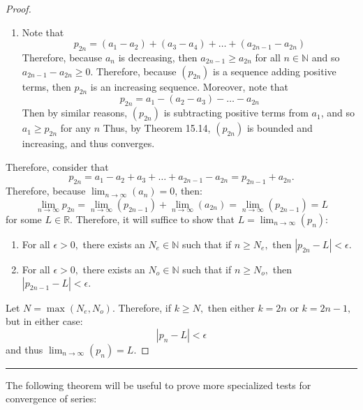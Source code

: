 \documentclass[openany, amssymb, psamsfonts]{amsart}
\newcommand{\bbN}{\mathbb{N}}
\newcommand{\bbR}{\mathbb{R}}
\theoremstyle{definition}
\numberwithin{equation}{section}
\begin{document}
\begin{proof}
\begin{enumerate}
    \item 
    Note that \[p_{2n} =  (a_1 - a_2)  + (a_3 - a_4) + \dots + (a_{2n-1} -a_{2n})\] Therefore, because $a_n$ is decreasing, then $a_{2n-1}\geq a_{2n}$ for all $n \in \bbN$ and so $a_{2n-1} - a_{2n}\geq 0.$ Therefore, because $(p_{2n})$ is a sequence adding positive terms, then $p_{2n}$ is an increasing sequence. Moreover, note that \[p_{2n} = a_1 - (a_2 - a_3) - \dots - a_{2n}\] Then by similar reasons, $(p_{2n})$ is subtracting positive terms from $a_1$, and so $a_1\geq p_{2n}$ for any $n$ Thus, by Theorem 15.14, $(p_{2n})$ is bounded and increasing, and thus converges.
\end{enumerate}
Therefore, consider that \[p_{2n} = a_1 - a_2  + a_3 + \dots +a_{2n-1}- a_{2n} = p_{2n-1} + a_{2n}.\] Therefore, because $\displaystyle\lim_{n\to \infty}(a_n) = 0$, then: \[\displaystyle\lim_{n\to \infty}p_{2n} = \displaystyle\lim_{n\to \infty}(p_{2n-1}) + \displaystyle\lim_{n\to \infty}(a_{2n})  = \displaystyle\lim_{n\to \infty}(p_{2n-1}) = L\] for some $L \in \bbR.$ Therefore, it will suffice to show that $L = \displaystyle\lim_{n\to \infty}(p_n):$\newline\newline
\begin{enumerate}
    \item For all $\epsilon>0,$ there exists an $N_e \in \bbN$ such that if $n\geq N_e,$ then $|p_{2n} - L|< \epsilon.$
    \item For all $\epsilon>0,$ there exists an $N_o\in \bbN$ such that if $n\geq N_o,$ then $|p_{2n-1}- L| < \epsilon.$
\end{enumerate}
Let $N = \max(N_e, N_o).$ Therefore, if $k\geq N,$ then either $k = 2n$ or $k = 2n-1,$ but in either case:
\[|p_n - L|< \epsilon\] and thus $\displaystyle\lim_{n\to \infty}(p_n) = L.$
\end{proof}\vspace{4pt}     \hrule   \vspace{4pt}


The following theorem will be useful to prove more specialized tests for convergence of series:
\end{document}

